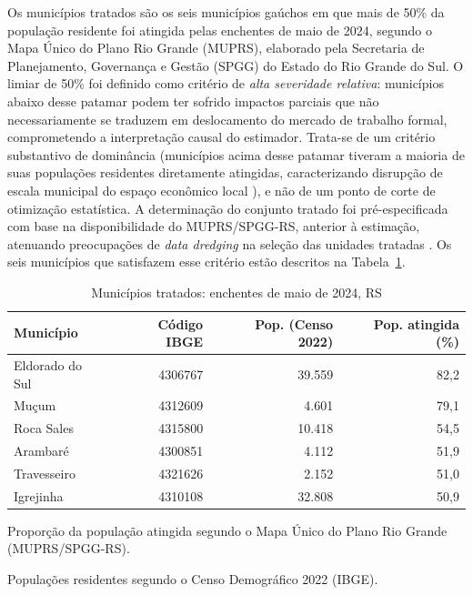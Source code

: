 \documentclass[a4paper,12pt]{article}
\begin{document}
Os municípios tratados são os seis municípios gaúchos em que mais de 50\% da
população residente foi atingida pelas enchentes de maio de 2024, segundo o Mapa
Único do Plano Rio Grande (MUPRS), elaborado pela Secretaria de Planejamento,
Governança e Gestão (SPGG) do Estado do Rio Grande do Sul.
O limiar de 50\% foi definido como critério de \emph{alta severidade relativa}: municípios
abaixo desse patamar podem ter sofrido impactos parciais que não necessariamente se
traduzem em deslocamento do mercado de trabalho formal, comprometendo a
interpretação causal do estimador. Trata-se de um critério substantivo de dominância
(municípios acima desse patamar tiveram a maioria de suas populações residentes
diretamente atingidas, caracterizando disrupção de escala municipal do espaço econômico
local \cite{cavallo2013}), e não de um ponto de corte de otimização estatística.
A determinação do conjunto tratado foi pré-especificada com base na disponibilidade
do MUPRS/SPGG-RS, anterior à estimação, atenuando preocupações de \textit{data
dredging} na seleção das unidades tratadas \cite{angrist2009}. Os seis municípios que
satisfazem esse critério estão descritos na Tabela~\ref{tab:municipios_tratados}.

\begin{table}[htbp]
\centering
\caption{Municípios tratados: enchentes de maio de 2024, RS}
\label{tab:municipios_tratados}
\begin{threeparttable}
\small
\begin{tabular}{l r r r}
\toprule
Município & Código IBGE & Pop. (Censo 2022) & Pop. atingida (\%) \\
\midrule
Eldorado do Sul & 4306767 & 39.559 & 82{,}2 \\
Mu\c{c}um       & 4312609 &  4.601 & 79{,}1 \\
Roca Sales      & 4315800 & 10.418 & 54{,}5 \\
Arambaré        & 4300851 &  4.112 & 51{,}9 \\
Travesseiro     & 4321626 &  2.152 & 51{,}0 \\
Igrejinha       & 4310108 & 32.808 & 50{,}9 \\
\bottomrule
\end{tabular}
\begin{tablenotes}[flushleft]
\footnotesize
\item Proporção da população atingida segundo o Mapa Único do Plano Rio Grande (MUPRS/SPGG-RS).
\item Populações residentes segundo o Censo Demográfico 2022 (IBGE).
\end{tablenotes}
\end{threeparttable}
\end{table}
\end{document}
